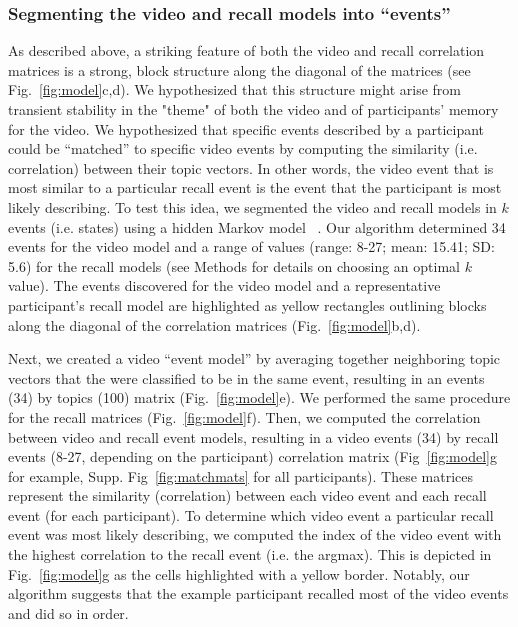 \documentclass{article}
\begin{document}
{\subsubsection{Segmenting the video and recall models into ``events''}
As described above, a striking feature of both the video and recall correlation matrices is a strong, block structure along the diagonal of the matrices (see Fig.~\ref{fig:model}c,d).  We hypothesized that this structure might arise from transient stability in the "theme" of both the video and of participants' memory for the video. We hypothesized that specific events described by a participant could be ``matched'' to specific video events by computing the similarity (i.e. correlation) between their topic vectors. In other words, the video event that is most similar to a particular recall event is the event that the participant is most likely describing. To test this idea, we segmented the video and recall models in $k$ events (i.e. states) using a hidden Markov model ~\citep{BaldEtal17}. Our algorithm determined 34 events for the video model and a range of values (range: 8-27; mean: 15.41; SD: 5.6) for the recall models (see Methods for details on choosing an optimal $k$ value).  The events discovered for the video model and a representative participant's recall model are highlighted as yellow rectangles outlining blocks along the diagonal of the correlation matrices (Fig.~\ref{fig:model}b,d).

Next, we created a video ``event model'' by averaging together neighboring topic vectors that the were classified to be in the same event, resulting in an events (34) by topics (100) matrix (Fig.~\ref{fig:model}e).  We performed the same procedure for the recall matrices (Fig.~\ref{fig:model}f). Then, we computed the correlation between video and recall event models, resulting in a video events (34) by recall events (8-27, depending on the participant) correlation matrix (Fig~\ref{fig:model}g for example, Supp. Fig~\ref{fig:matchmats} for all participants). These matrices represent the similarity (correlation) between each video event and each recall event (for each participant). To determine which video event a particular recall event was most likely describing, we computed the index of the video event with the highest correlation to the recall event (i.e. the argmax).  This is depicted in Fig.~\ref{fig:model}g as the cells highlighted with a yellow border. Notably, our algorithm suggests that the example participant recalled most of the video events and did so in order.

}
\end{document}
